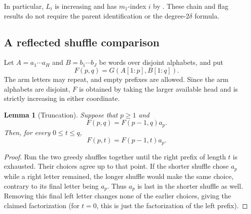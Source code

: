 \documentclass[11pt]{amsart}
\numberwithin{equation}{section}
\newtheorem{lemma}[theorem]{Lemma}
\theoremstyle{definition}
\begin{document}
In particular, $L_i$ is increasing and has $m_1$-index $i$ by \cite[Corollary~3.11]{ETC}. These chain and flag results do not require the parent identification or the degree-$2\delta$ formula.

\subsection{A reflected shuffle comparison}\label{subsec:exchange}
Let $A=a_1\cdots a_H$ and $B=b_1\cdots b_J$ be words over disjoint alphabets, and put
\[
 F(p,q)=G(A[1:p],B[1:q]).
\]
The arm letters may repeat, and empty prefixes are allowed. Since the arm alphabets are disjoint, $F$ is obtained by taking the larger available head and is strictly increasing in either coordinate.

\begin{lemma}[Truncation]\label{lem:truncation}
Suppose that $p\geq1$ and
\[
 F(p,q)=F(p-1,q)a_p.
\]
Then, for every $0\leq t\leq q$,
\[
 F(p,t)=F(p-1,t)a_p.
\]
\end{lemma}
\begin{proof}
Run the two greedy shuffles together until the right prefix of length $t$ is exhausted. Their choices agree up to that point. If the shorter shuffle chose $a_p$ while a right letter remained, the longer shuffle would make the same choice, contrary to its final letter being $a_p$. Thus $a_p$ is last in the shorter shuffle as well. Removing this final left letter changes none of the earlier choices, giving the claimed factorization (for $t=0$, this is just the factorization of the left prefix).
\end{proof}
\end{document}
